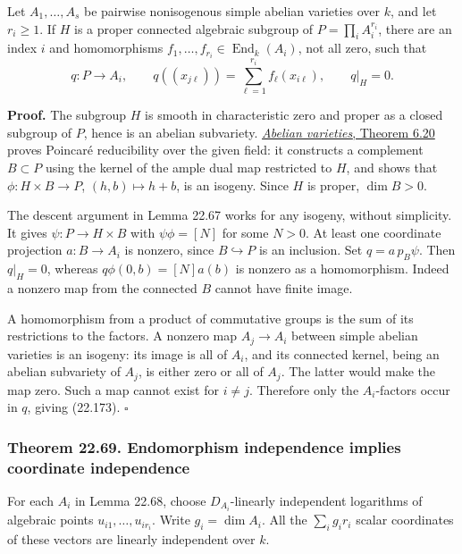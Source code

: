 \documentclass[
  11pt,
  a4paper,
]{article}
\begin{document}
Let \(A_1,\ldots,A_s\) be pairwise nonisogenous simple abelian varieties
over \(k\), and let \(r_i\ge1\). If \(H\) is a proper connected
algebraic subgroup of \(P=\prod_i A_i^{r_i}\), there are an index \(i\)
and homomorphisms \(f_1,\ldots,f_{r_i}\in\operatorname{End}_k(A_i)\),
not all zero, such that \[
 q:P\longrightarrow A_i,\qquad
 q((x_{j\ell}))=\sum_{\ell=1}^{r_i}f_\ell(x_{i\ell}),
 \qquad q|_H=0.
 \tag{22.173}
\]

\textbf{Proof.} The subgroup \(H\) is smooth in characteristic zero and
proper as a closed subgroup of \(P\), hence is an abelian subvariety.
\href{https://github.com/KokunoYumeto/open-math-courses-public/blob/146dc81802e69cf262fb6cc65c1b9f74e71f4625/docs/courses/AG-GS/src/abelian-varieties.md\#the-representing-dual-and-its-universal-bundle}{\emph{Abelian
varieties}, Theorem 6.20} proves Poincaré reducibility over the given
field: it constructs a complement \(B\subset P\) using the kernel of the
ample dual map restricted to \(H\), and shows that
\(\phi:H\times B\to P\), \((h,b)\mapsto h+b\), is an isogeny. Since
\(H\) is proper, \(\dim B>0\).

The descent argument in Lemma 22.67 works for any isogeny, without
simplicity. It gives \(\psi:P\to H\times B\) with \(\psi\phi=[N]\) for
some \(N>0\). At least one coordinate projection \(a:B\to A_i\) is
nonzero, since \(B\hookrightarrow P\) is an inclusion. Set
\(q=a\,p_B\psi\). Then \(q|_H=0\), whereas \(q\phi(0,b)=[N]a(b)\) is
nonzero as a homomorphism. Indeed a nonzero map from the connected \(B\)
cannot have finite image.

A homomorphism from a product of commutative groups is the sum of its
restrictions to the factors. A nonzero map \(A_j\to A_i\) between simple
abelian varieties is an isogeny: its image is all of \(A_i\), and its
connected kernel, being an abelian subvariety of \(A_j\), is either zero
or all of \(A_j\). The latter would make the map zero. Such a map cannot
exist for \(i\ne j\). Therefore only the \(A_i\)-factors occur in \(q\),
giving (22.173). \(\square\)

\subsubsection{Theorem 22.69. Endomorphism independence implies
coordinate
independence}\label{theorem-22.69.-endomorphism-independence-implies-coordinate-independence}

For each \(A_i\) in Lemma 22.68, choose \(D_{A_i}\)-linearly independent
logarithms of algebraic points \(u_{i1},\ldots,u_{ir_i}\). Write
\(g_i=\dim A_i\). All the \(\sum_i g_i r_i\) scalar coordinates of these
vectors are linearly independent over \(k\).
\end{document}

